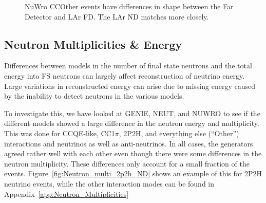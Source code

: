 \documentclass[12pt]{article}
\begin{document}
\begin{figure}[h]
\endminipage
\caption{NuWro CCOther events have differences in shape between the Far Detector and LAr FD. The LAr ND matches more closely.}
\label{fig:numubar_Etrue_ereco_CCOther_diffs}
\end{figure}
\FloatBarrier




\subsection{Neutron Multiplicities \& Energy}

Differences between models in the number of final state neutrons and the total energy into FS neutrons can largely affect reconstruction of neutrino energy. Large variations in reconstructed energy can arise due to missing energy caused by the inability to detect neutrons in the various models.  

To investigate this, we have looked at GENIE, NEUT, and NUWRO to see if the different models showed a large difference in the neutron energy and multiplicity.  
This was done for CCQE-like, CC1$\pi$, 2P2H, and everything else (``Other'') interactions and neutrinos as well as anti-neutrinos.  
In all cases, the generators agreed rather well with each other even though there were some differences in the neutron multiplicity. 
These differences only account for a small fraction of the events.
Figure~\ref{fig:Neutron_multi_2p2h_ND} shows an example of this for 2P2H neutrino events, while the other interaction modes can be found in Appendix~\ref{app:Neutron_Multiplicities}
  
\end{document}
